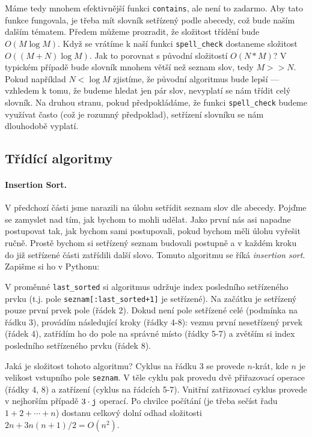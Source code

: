 Máme tedy mnohem efektivnější funkci {\tt contains}, ale není to zadarmo. Aby tato funkce fungovala, je třeba mít slovník setřízený podle abecedy, což bude naším dalším tématem.
Předem můžeme prozradit, že složitost třídění bude $O(M\log M)$. Když se vrátíme k naší funkci {\tt spell\_check} dostaneme složitost $O((M+N)\log M)$. Jak to porovnat
s původní složitostí $O(N*M)$? V typickém případě bude slovník mnohem větší než seznam slov, tedy $M>>N$. Pokud například $N<\log M$ zjistíme, že původní algoritmus
bude lepší --- vzhledem k tomu, že budeme hledat jen pár slov, nevyplatí se nám třídit celý slovník. Na druhou stranu, pokud předpokládáme, že funkci {\tt spell\_check}
budeme využívat často (což je rozumný předpoklad), setřízení slovníku se nám dlouhodobě vyplatí.

\subsection*{Třídící algoritmy}
\paragraph{Insertion Sort.}
V předchozí části jsme narazili na úlohu setřídit seznam slov dle abecedy. Pojďme se zamyslet nad tím, jak bychom to mohli udělat. Jako první nás asi napadne postupovat
tak, jak bychom sami postupovali, pokud bychom měli úlohu vyřešit ručně. Prostě bychom si setřízený seznam budovali postupně a v každém kroku do již setřízené části
zatřídili další slovo. Tomuto algoritmu se říká \emph{insertion sort}. Zapišme si ho v Pythonu:


V proměnné {\tt last\_sorted} si algoritmus udržuje index posledního setřízeného prvku (t.j. pole {\tt seznam[:last\_sorted+1]} je setřízené).
Na začátku je setřízený pouze první prvek pole (řádek 2). Dokud není pole setřízené celé (podmínka na řádku 3), provádím následující kroky (řádky 4-8):
vezmu první nesetřízený prvek (řádek 4), zatřídím ho do pole na správné místo (řádky 5-7) a zvětším si index posledního setřízeného prvku (řádek 8).

Jaká je složitost tohoto algoritmu? Cyklus na řádku 3 se provede $n$-krát, kde $n$ je velikost vstupního pole {\tt seznam}. V těle cyklu pak provedu
dvě přiřazovací operace (řádky 4, 8) a zatřízení (cyklus na řádcích 5-7). Vnitřní zatřizovací cyklus provede v nejhorším případě $3\cdot {\tt j}$ operací.
Po chvilce počítání (je třeba sečíst řadu $1 + 2 + \cdots + n$) dostanu celkový dolní odhad složitosti $2n + 3n(n+1)/2 = O(n^2)$.

